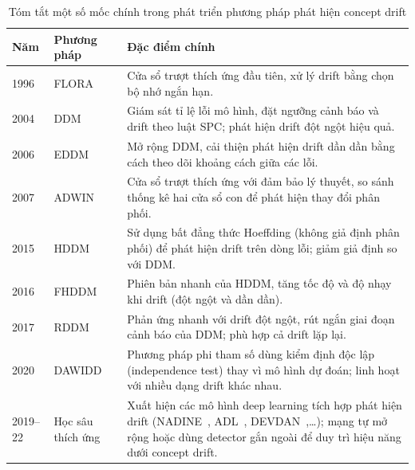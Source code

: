 \begin{table}[H]
	\centering
	\caption{Tóm tắt một số mốc chính trong phát triển phương pháp phát hiện concept drift}\label{tab:drift-history}
	\begin{tabular}{@{}p{1.2cm}p{2.8cm}p{9cm}@{}}
		\toprule
		\textbf{Năm} & \textbf{Phương pháp}                & \textbf{Đặc điểm chính}                                                                                                                                                                 \\
		\midrule
		1996         & FLORA~\cite{widmer1996learning}     & Cửa sổ trượt thích ứng đầu tiên, xử lý drift bằng chọn bộ nhớ ngắn hạn.                                                                                                                 \\
		2004         & DDM~\cite{gama2004learning}         & Giám sát tỉ lệ lỗi mô hình, đặt ngưỡng cảnh báo và drift theo luật SPC; phát hiện drift đột ngột hiệu quả.                                                                              \\
		2006         & EDDM~\cite{baena2006early}          & Mở rộng DDM, cải thiện phát hiện drift dần dần bằng cách theo dõi khoảng cách giữa các lỗi.                                                                                             \\
		2007         & ADWIN~\cite{bifet2007learning}      & Cửa sổ trượt thích ứng với đảm bảo lý thuyết, so sánh thống kê hai cửa sổ con để phát hiện thay đổi phân phối.                                                                          \\
		2015         & HDDM~\cite{friasblanco2015hddm}     & Sử dụng bất đẳng thức Hoeffding (không giả định phân phối) để phát hiện drift trên dòng lỗi; giảm giả định so với DDM.                                                                     \\
		2016         & FHDDM~\cite{pesaranghader2016fhddm} & Phiên bản nhanh của HDDM, tăng tốc độ và độ nhạy khi drift (đột ngột và dần dần).                                                                                                       \\
		2017         & RDDM~\cite{barros2017rddm}          & Phản ứng nhanh với drift đột ngột, rút ngắn giai đoạn cảnh báo của DDM; phù hợp cả drift lặp lại.                                                                                       \\
		2020         & DAWIDD~\cite{hinder2020dawidd}      & Phương pháp phi tham số dùng kiểm định độc lập (independence test) thay vì mô hình dự đoán; linh hoạt với nhiều dạng drift khác nhau.                                                   \\
		2019--22     & Học sâu thích ứng                   & Xuất hiện các mô hình deep learning tích hợp phát hiện drift (NADINE~\cite{pratama2019automatic}, ADL~\cite{ashfahani2019adl}, DEVDAN~\cite{ashfahani2020devdan},…); mạng tự mở rộng hoặc dùng detector gắn ngoài để duy trì hiệu năng dưới concept drift. \\
		\bottomrule
	\end{tabular}
\end{table}
